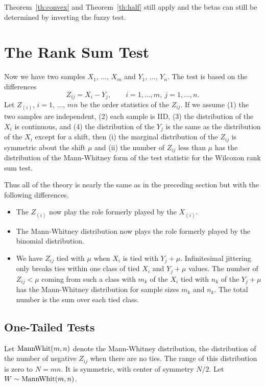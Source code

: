 \documentclass{article}
\newcommand{\MannWhitneyDis}{\text{\upshape MannWhit}}
\begin{document}
Theorem~\ref{th:convex} and Theorem~\ref{th:half} still apply
and the betas can still be determined by inverting the fuzzy test.

\section{The Rank Sum Test}

Now we have two samples $X_1$, $\ldots$, $X_m$ and $Y_1$, $\ldots$, $Y_n$.
The test is based on the differences
$$
   Z_{i j} = X_i - Y_j, \qquad i = 1, \ldots, m, \ j = 1, \ldots, n.
$$
Let $Z_{(i)}$, $i = 1$, $\ldots$, $m n$ be the order statistics of the
$Z_{i j}$.  If we assume (1) the two samples are independent,
(2) each sample is IID, (3) the distribution of the $X_i$ is continuous,
and (4) the distribution of the $Y_j$ is the same as the distribution of
the $X_i$ except for a shift, then (i) the marginal distribution of the
$Z_{i j}$ is symmetric about the shift $\mu$ and (ii) the number of
$Z_{i j}$ less than $\mu$ has the distribution of the Mann-Whitney form
of the test statistic for the Wilcoxon rank sum test.

Thus all of the theory is nearly the same as in the preceding section
but with the following differences.
\begin{itemize}
\item The $Z_{(i)}$ now play the role formerly played by the $X_{(i)}$.
\item The Mann-Whitney distribution now plays the role formerly played by
    the binomial distribution.
\item We have $Z_{i j}$ tied with $\mu$ when $X_i$ is tied with $Y_j + \mu$.
    Infinitesimal jittering only breaks ties within one class of tied
    $X_i$ and $Y_j + \mu$ values.  The number of $Z_{i j} < \mu$ coming from
    such a class with $m_k$ of the $X_i$ tied with $n_k$ of the $Y_j + \mu$
    has the Mann-Whitney distribution for sample sizes $m_k$ and $n_k$.
    The total number is the sum over each tied class.
\end{itemize}

\subsection{One-Tailed Tests}

Let $\MannWhitneyDis(m, n)$ denote the Mann-Whitney distribution,
the distribution
of the number of negative $Z_{i j}$ when there are no ties.  The range of
this distribution is zero to $N = m n$.  It is symmetric, with center of
symmetry $N / 2$.  Let $W \sim \MannWhitneyDis(m, n)$.
\end{document}
